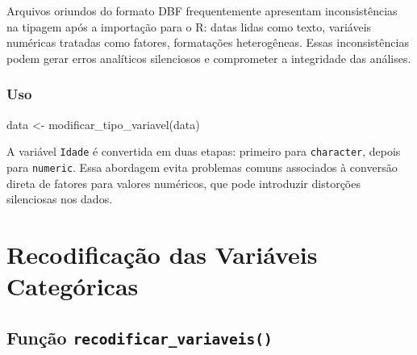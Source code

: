 \documentclass[
  brazilian,
  a4paper,
  oneside]{scrbook}
\newenvironment{Shaded}{\begin{snugshade}}{\end{snugshade}}
\newcommand{\FunctionTok}[1]{\textcolor[rgb]{0.28,0.35,0.67}{#1}}
\newcommand{\NormalTok}[1]{\textcolor[rgb]{0.00,0.23,0.31}{#1}}
\newcommand{\OtherTok}[1]{\textcolor[rgb]{0.00,0.23,0.31}{#1}}
\begin{document}
Arquivos oriundos do formato DBF frequentemente apresentam
inconsistências na tipagem após a importação para o R: datas lidas como
texto, variáveis numéricas tratadas como fatores, formatações
heterogêneas. Essas inconsistências podem gerar erros analíticos
silenciosos e comprometer a integridade das análises.

\subsection{Uso}\label{uso-2}

\begin{Shaded}
\begin{Highlighting}[]
\NormalTok{data }\OtherTok{\textless{}{-}} \FunctionTok{modificar\_tipo\_variavel}\NormalTok{(data)}
\end{Highlighting}
\end{Shaded}

\begin{tcolorbox}[enhanced jigsaw, arc=.35mm, bottomrule=.15mm, bottomtitle=1mm, breakable, colback=white, colbacktitle=quarto-callout-tip-color!10!white, colframe=quarto-callout-tip-color-frame, coltitle=black, left=2mm, leftrule=.75mm, opacityback=0, opacitybacktitle=0.6, rightrule=.15mm, title=\textcolor{quarto-callout-tip-color}{\faLightbulb}\hspace{0.5em}{Conversão segura de \texttt{Idade}}, titlerule=0mm, toprule=.15mm, toptitle=1mm]

A variável \texttt{Idade} é convertida em duas etapas: primeiro para
\texttt{character}, depois para \texttt{numeric}. Essa abordagem evita
problemas comuns associados à conversão direta de fatores para valores
numéricos, que pode introduzir distorções silenciosas nos dados.

\end{tcolorbox}


\chapter{Recodificação das Variáveis
Categóricas}\label{recodificauxe7uxe3o-das-variuxe1veis-categuxf3ricas}

\section{\texorpdfstring{Função
\texttt{recodificar\_variaveis()}}{Função recodificar\_variaveis()}}\label{funuxe7uxe3o-recodificar_variaveis}
\end{document}
